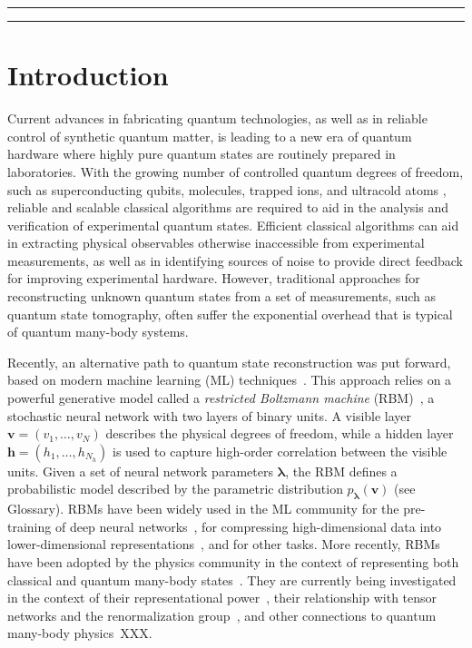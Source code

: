 \documentclass[submission, Phys, hidelnks]{SciPost}
\begin{document}
\vspace{10pt}
\noindent\rule{\textwidth}{1pt}
\tableofcontents\thispagestyle{fancy}
\noindent\rule{\textwidth}{1pt}
\vspace{10pt}

\section{Introduction}
Current advances in fabricating quantum technologies, as well as in reliable control of synthetic quantum matter, is leading to a new era of quantum 
hardware where highly pure quantum states are routinely prepared in laboratories. 
With the growing number of controlled quantum degrees of freedom, such as superconducting qubits, molecules, trapped ions, and ultracold atoms \cite{gambetta17,gambetta18,Bernien17}, reliable and scalable classical algorithms are required to aid in the analysis and verification of experimental quantum states. 
Efficient classical algorithms can aid in extracting physical observables otherwise inaccessible from experimental measurements, as well as in identifying 
sources of noise to provide direct feedback for improving experimental hardware. However, traditional approaches for reconstructing unknown quantum states from a set of measurements, such as quantum state tomography, often suffer the exponential overhead that is typical of quantum many-body systems.

Recently, an alternative path to quantum state reconstruction was put forward, based on modern machine learning (ML) techniques~\cite{torlai2018tomography, TorlaiMixed}. This approach relies on a powerful generative model called a {\it restricted Boltzmann machine} (RBM)~\cite{Smolensky}, a stochastic neural network with two layers of binary units. A visible layer $\bm{v}=(v_1,\dots,v_N)$ describes the physical degrees of freedom, while a hidden layer $\bm{h}=(h_1,\dots,h_{N_h})$ is used to capture high-order correlation between the visible units. Given a set of neural network parameters $\bm{\lambda}$, the RBM defines a probabilistic model described by the parametric distribution $p_{\bm{\lambda}}(\bm{v})$ (see Glossary). RBMs have been widely used in the ML community for the pre-training of deep neural networks~\cite{Hinton06}, for compressing high-dimensional data into lower-dimensional representations~\cite{Hinton504}, and for other tasks. More recently, RBMs have been adopted by the physics community in the context of representing both classical and quantum many-body states~\cite{Torlai2016thermo, CarleoTroyer2017Science}.  They are currently being investigated in the context of their representational power~\cite{Gao}, their relationship with tensor networks and the renormalization group~\cite{GlasserCirac2018,Maciej}, and other connections to quantum many-body physics~XXX.
\end{document}
